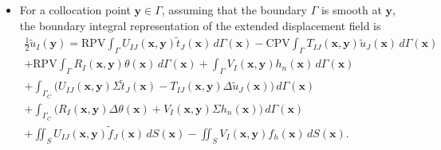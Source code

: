 \begin{itemize}
	
	\item For a collocation point $\mathbf{y}\in\Gamma$, assuming that the
	boundary $\Gamma$ is smooth at $\mathbf{y}$, the boundary integral
	representation of the extended displacement field is
\begin{multline}
	\frac{1}{2}\tilde{u}_I(\mathbf{y})
	=
	\mathrm{RPV}\!\int_{\Gamma}
	U_{IJ}(\mathbf{x},\mathbf{y})\tilde{t}_J(\mathbf{x})\,d\Gamma(\mathbf{x})
	-
	\mathrm{CPV}\!\int_{\Gamma}
	T_{IJ}(\mathbf{x},\mathbf{y})\tilde{u}_J(\mathbf{x})\,d\Gamma(\mathbf{x})
	\\
	+
	\mathrm{RPV}\!\int_{\Gamma}
	R_I(\mathbf{x},\mathbf{y})\theta(\mathbf{x})\,d\Gamma(\mathbf{x})
	+
	\int_{\Gamma}
	V_I(\mathbf{x},\mathbf{y})h_n(\mathbf{x})\,d\Gamma(\mathbf{x})
	\\
	+
	\int_{\Gamma_C}
	\big(
	U_{IJ}(\mathbf{x},\mathbf{y})\Sigma\tilde{t}_J(\mathbf{x})
	-
	T_{IJ}(\mathbf{x},\mathbf{y})\Delta\tilde{u}_J(\mathbf{x})
	\big)\,d\Gamma(\mathbf{x})
	\\
	+
	\int_{\Gamma_C}
	\big(
	R_I(\mathbf{x},\mathbf{y})\Delta\theta(\mathbf{x})
	+
	V_I(\mathbf{x},\mathbf{y})\Sigma h_n(\mathbf{x})
	\big)\,d\Gamma(\mathbf{x})
	\\
	+
	\iint_{S}
	U_{IJ}(\mathbf{x},\mathbf{y})\tilde{f}_J(\mathbf{x})\,dS(\mathbf{x})
	-
	\iint_{S}
	V_I(\mathbf{x},\mathbf{y})f_h(\mathbf{x})\,dS(\mathbf{x}).
	\label{KushnirEq9}
\end{multline}
	

\end{itemize}
